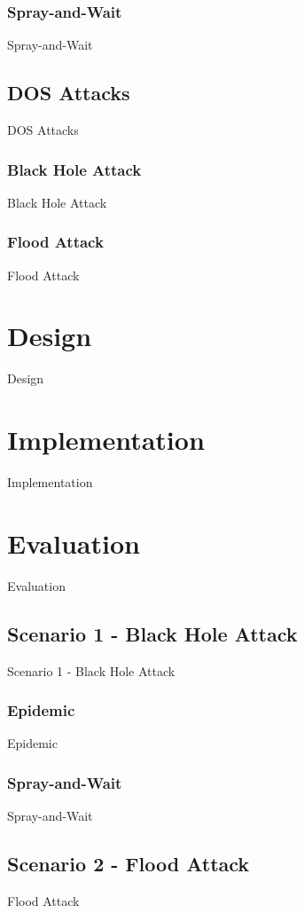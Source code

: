\documentclass{article}
\begin{document}
\subsubsection{Spray-and-Wait}
Spray-and-Wait

\subsection{DOS Attacks}
DOS Attacks

\subsubsection{Black Hole Attack}
Black Hole Attack

\subsubsection{Flood Attack}
Flood Attack

\section{Design}
Design

\section{Implementation}
Implementation

\section{Evaluation}
Evaluation

\subsection{Scenario 1 - Black Hole Attack}
Scenario 1 - Black Hole Attack

\subsubsection{Epidemic}
Epidemic

\subsubsection{Spray-and-Wait}
Spray-and-Wait

\subsection{Scenario 2 - Flood Attack}
Flood Attack
\end{document}
